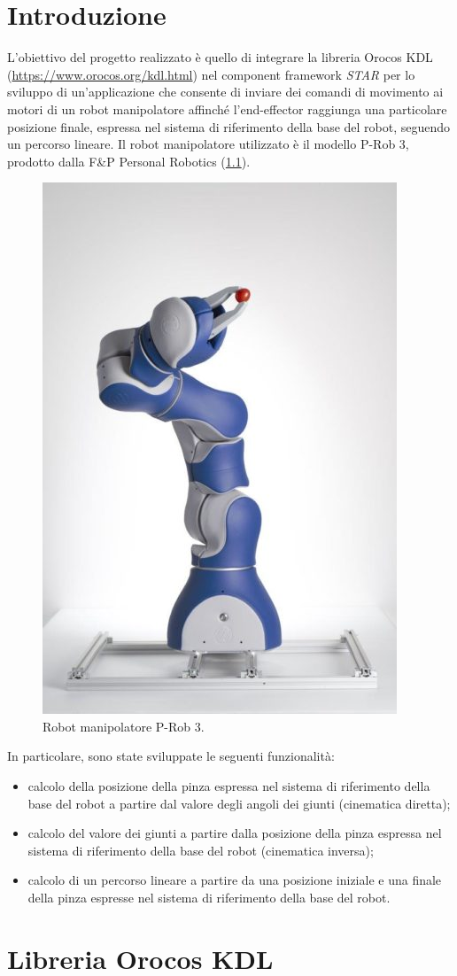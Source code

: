
\chapter{Introduzione}
L'obiettivo del progetto realizzato è quello di integrare la libreria Orocos KDL (\url{https://www.orocos.org/kdl.html}) nel component framework \textit{STAR} per lo sviluppo di un'applicazione che consente di inviare dei comandi di movimento ai motori di un robot manipolatore affinché l'end-effector raggiunga una particolare posizione finale, espressa nel sistema di riferimento della base del robot, seguendo un percorso lineare. Il robot manipolatore utilizzato è il modello P-Rob 3, prodotto dalla F\&P Personal Robotics (\Fig\ref{fig:prob3}). 
\begin{figure}[b!]
	\centering
	\includegraphics[width=0.4\linewidth]{./ImageFiles/P-Rob 3.jpg}
	\caption{Robot manipolatore P-Rob 3.}
	\label{fig:prob3}
\end{figure}
In particolare, sono state sviluppate le seguenti funzionalità:
\begin{itemize}
	\item calcolo della posizione della pinza espressa nel sistema di riferimento della base del robot a partire dal valore degli angoli dei giunti (cinematica diretta);
	\item calcolo del valore dei giunti a partire dalla posizione della pinza espressa nel sistema di riferimento della base del robot (cinematica inversa);
	\item calcolo di un percorso lineare a partire da una posizione iniziale e una finale della pinza espresse nel sistema di riferimento della base del robot.
\end{itemize}

\chapter{Libreria Orocos KDL}
